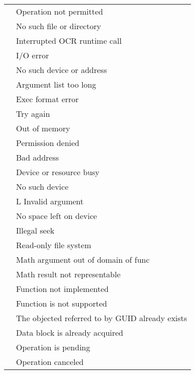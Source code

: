 \tablelasttail{\hline}
\begin{supertabular}{p{1.25in} p{2.75in}}
\label{tab:errorcodes}
 & Operation not permitted\\
 & No such file or directory\\
 & Interrupted OCR runtime call\\
 & I/O error\\
 & No such device or address\\
 & Argument list too long\\
 & Exec format error\\
 & Try again\\
 & Out of memory\\
 & Permission denied\\
 & Bad address\\
 & Device or resource busy\\
 & No such device\\
 &L Invalid argument\\
 & No space left on device\\
 & Illegal seek\\
 & Read-only file system\\
 & Math argument out of domain of func\\
 & Math result not representable\\
 & Function not implemented\\
 & Function is not supported\\
 & The objected referred to by GUID already exists\\
 & Data block is already acquired\\
 & Operation is pending\\
 & Operation canceled\\
\end{supertabular}


